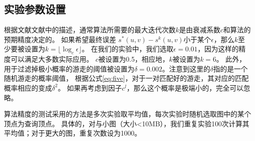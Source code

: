 \documentclass[master]{njuthesis}
\begin{document}
\subsection{实验参数设置}
根据文献文献\cite{lizorkin2008accuracy}中的描述，通常算法所需要的最大迭代次数$k$是由衰减系数$c$和算法的预期精度决定的。 
如果希望最终误差 $s^*(u,v) - s^k(u,v)$小于某个$\epsilon$，那么$k$至少要被设置为$k=\lfloor \log_c \epsilon \rfloor$。
在我们的实验中，我们选取$\epsilon=0.01$，因为这样的精度可以满足大多数实际应用。 
$c$被设置为0.5，相应地，$k$被设置为$k=6$。
此外，用于过滤掉极小概率的游走的阈值被设置为$\delta=0.002$。注意到这里的$\delta$指的是一个随机游走的概率阈值，
根据公式\ref{eq:five}，对于一对匹配好的游走，其对应的匹配概率相应的变成${\delta}^2$。
如果再考虑到因子$c^l$，那么这个概率是极端小的，完全可以忽略。

算法精度的测试采用的方法是多次实验取平均值，每次实验时随机选取图中的某个顶点为查询顶点。
具体的，对与小图（大小<10MB），我们重复实验100次计算其平均值；对于更大的图，重复次数设为1000。
\end{document}
